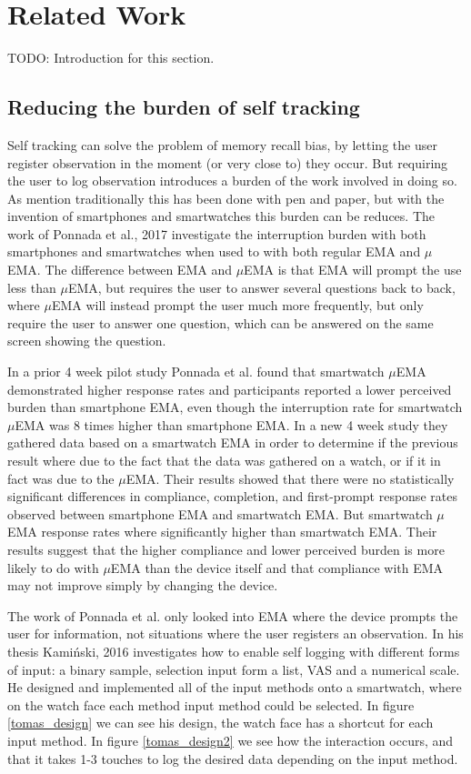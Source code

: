 \chapter{Related Work}

TODO: Introduction for this section. 

\section{Reducing the burden of self tracking}
Self tracking can solve the problem of memory recall bias, by letting the user register observation in the moment (or very close to) they occur. But requiring the user to log observation introduces a burden of the work involved in doing so. As mention traditionally this has been done with pen and paper, but with the invention of smartphones and smartwatches this burden can be reduces. The work of Ponnada et al., 2017\cite{compare} investigate the interruption burden with both smartphones and smartwatches when used to with both regular EMA and $\mu$EMA. The difference between EMA and $\mu$EMA is that EMA will prompt the use less than $\mu$EMA, but requires the user to answer several questions back to back, where $\mu$EMA will instead prompt the user much more frequently, but only require the user to answer one question, which can be answered on the same screen showing the question. 

In a prior 4 week pilot study Ponnada et al. found that smartwatch $\mu$EMA demonstrated higher response rates and participants reported a lower perceived burden than smartphone EMA, even though the interruption rate for smartwatch $\mu$EMA was 8 times higher than smartphone EMA. In a new 4 week study they gathered data based on a smartwatch EMA in order to determine if the previous result where due to the fact that the data was gathered on a watch, or if it in fact was due to the $\mu$EMA. Their results showed that there were no statistically significant differences in compliance, completion, and first-prompt response rates observed between smartphone EMA and smartwatch EMA. But smartwatch $\mu$EMA response rates where significantly higher than smartwatch EMA. Their results suggest that the higher compliance and lower perceived burden is more likely to do with $\mu$EMA than the device itself and that compliance with EMA may not improve simply by changing the device.

The work of Ponnada et al. only looked into EMA where the device prompts the user for information, not situations where the user registers an observation. In his thesis Kami\'nski, 2016\cite{tomas} investigates how to enable self logging with different forms of input: a binary sample, selection input form a list, VAS and a numerical scale. He designed and implemented all of the input methods onto a smartwatch, where on the watch face each method input method could be selected. In figure \ref{tomas_design} we can see his design, the watch face has a shortcut for each input method. In figure \ref{tomas_design2} we see how the interaction occurs, and that it takes 1-3 touches to log the desired data depending on the input method.

